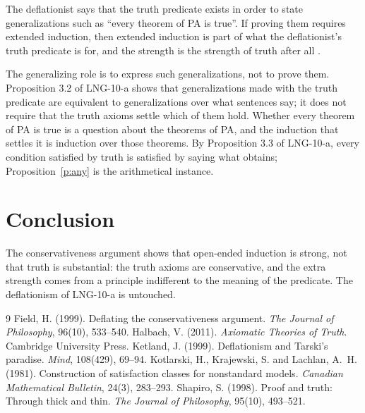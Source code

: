 \documentclass{situationist-preprint}
\begin{document}
\begin{objection}
The deflationist says that the truth predicate exists in order to state generalizations such as \enquote{every theorem of PA is true}. If proving them requires extended induction, then extended induction is part of what the deflationist's truth predicate is for, and the strength is the strength of truth after all \citep{Ketland1999}.
\end{objection}

\begin{reply}
The generalizing role is to express such generalizations, not to prove them. Proposition 3.2 of LNG-10-a shows that generalizations made with the truth predicate are equivalent to generalizations over what sentences say; it does not require that the truth axioms settle which of them hold. Whether every theorem of PA is true is a question about the theorems of PA, and the induction that settles it is induction over those theorems. By Proposition 3.3 of LNG-10-a, every condition satisfied by truth is satisfied by saying what obtains; Proposition~\ref{p:any} is the arithmetical instance.
\end{reply}

\section{Conclusion}

The conservativeness argument shows that open-ended induction is strong, not that truth is substantial: the truth axioms are conservative, and the extra strength comes from a principle indifferent to the meaning of the predicate. The deflationism of LNG-10-a is untouched.

\begin{thebibliography}{9}\small
{} Field, H. (1999). Deflating the conservativeness argument. \emph{The Journal of Philosophy}, 96(10), 533--540.
 Halbach, V. (2011). \emph{Axiomatic Theories of Truth}. Cambridge University Press.
 Ketland, J. (1999). Deflationism and Tarski's paradise. \emph{Mind}, 108(429), 69--94.
 Kotlarski, H., Krajewski, S. and Lachlan, A.~H. (1981). Construction of satisfaction classes for nonstandard models. \emph{Canadian Mathematical Bulletin}, 24(3), 283--293.
 Shapiro, S. (1998). Proof and truth: Through thick and thin. \emph{The Journal of Philosophy}, 95(10), 493--521.
\end{thebibliography}
\end{document}
